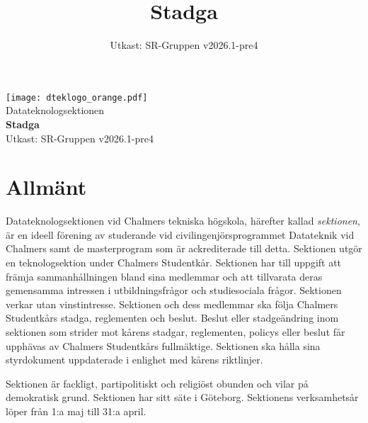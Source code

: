 \documentclass[a4paper]{dteklag}
\title{Stadga}
\date{Utkast: SR-Gruppen v2026.1-pre4}
\begin{document}
\begin{titlepage}
  \thispagestyle{empty} %
  \vspace*{1cm}
  \begin{center}
    \texttt{[image: dteklogo\_orange.pdf]}\\[3em]
    {\Huge Datateknologsektionen}\\[3em]
    {\Huge \textbf{Stadga}}\\[1em]
    Utkast: SR-Gruppen v2026.1-pre4
  \end{center}
\end{titlepage}

\makeheadfoot

\setcounter{tocdepth}{2}
\tableofcontents

\section{Allmänt}
\para[Ändamål] Datateknologsektionen vid Chalmers tekniska högskola, härefter kallad \textit{sektionen}, är en ideell förening av studerande vid civilingenjörsprogrammet Datateknik vid Chalmers samt de masterprogram som är ackrediterade till detta. Sektionen utgör en teknologsektion under Chalmers Studentkår. 
\para Sektionen har till uppgift att främja sammanhållningen bland sina medlemmar och att tillvarata deras gemensamma intressen i utbildningsfrågor och studiesociala frågor. Sektionen verkar utan vinstintresse.
\para Sektionen och dess medlemmar ska följa Chalmers Studentkårs stadga, reglementen och beslut. Beslut eller stadgeändring inom sektionen som strider mot kårens stadgar, reglementen, policys eller beslut får upphävas av Chalmers Studentkårs fullmäktige. Sektionen ska hålla sina styrdokument uppdaterade i enlighet med kårens riktlinjer. 

\para Sektionen är fackligt, partipolitiskt och religiöst obunden och vilar på demokratisk grund.
\para Sektionen har sitt säte i Göteborg.
\para Sektionens verksamhetsår löper från 1:a maj till 31:a april.


\end{document}

